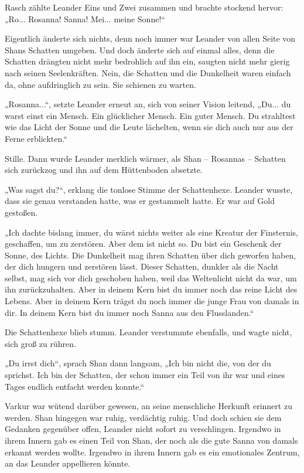Rasch zählte Leander Eins und Zwei zusammen und brachte stockend hervor: „Ro... Rosanna! Sanna! Mei... meine Sonne!“

Eigentlich änderte sich nichts, denn noch immer war Leander von allen Seite von Shans Schatten umgeben. Und doch änderte sich auf einmal alles, denn die Schatten drängten nicht mehr bedrohlich auf ihn ein, saugten nicht mehr gierig nach seinen Seelenkräften. Nein, die Schatten und die Dunkelheit waren einfach da, ohne aufdringlich zu sein. Sie schienen zu warten.

„Rosanna...“, setzte Leander erneut an, sich von seiner Vision leitend, „Du... du warst einst ein Mensch. Ein glücklicher Mensch. Ein guter Mensch. Du strahltest wie das Licht der Sonne und die Leute lächelten, wenn sie dich auch nur aus der Ferne erblickten.“

Stille. Dann wurde Leander merklich wärmer, als Shan – Rosannas – Schatten sich zurückzog und ihn auf dem Hüttenboden absetzte.

„Was sagst du?“, erklang die tonlose Stimme der Schattenhexe. Leander wusste, dass sie genau verstanden hatte, was er gestammelt hatte. Er war auf Gold gestoßen.

„Ich dachte bislang immer, du wärst nichts weiter als eine Kreatur der Finsternis, geschaffen, um zu zerstören. Aber dem ist nicht so. Du bist ein Geschenk der Sonne, des Lichts. Die Dunkelheit mag ihren Schatten über dich geworfen haben, der dich hungern und zerstören lässt. Dieser Schatten, dunkler als die Nacht selbst, mag sich vor dich geschoben haben, weil das Weltenlicht nicht da war, um ihn zurückzuhalten. Aber in deinem Kern bist du immer noch das reine Licht des Lebens. Aber in deinem Kern trägst du noch immer die junge Frau von damals in dir. In deinem Kern bist du immer noch Sanna aus den Flusslanden.“

Die Schattenhexe blieb stumm. Leander verstummte ebenfalls, und wagte nicht, sich groß zu rühren.

„Du irrst dich“, sprach Shan dann langsam, „Ich bin nicht die, von der du sprichst. Ich bin der Schatten, der schon immer ein Teil von ihr war und eines Tages endlich entfacht werden konnte.“

Varkur war wütend darüber gewesen, an seine menschliche Herkunft erinnert zu werden. Shan hingegen war ruhig, verdächtig ruhig. Und doch schien sie dem Gedanken gegenüber offen, Leander nicht sofort zu verschlingen. Irgendwo in ihrem Innern gab es einen Teil von Shan, der noch als die gute Sanna von damals erkannt werden wollte. Irgendwo in ihrem Innern gab es ein emotionales Zentrum, an das Leander appellieren könnte.

